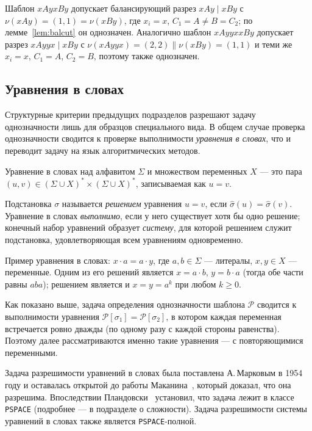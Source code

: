 \documentclass[14pt, russian]{scrartcl}
\begin{document}
\begin{Example}
Шаблон $x A y x B y$ допускает балансирующий разрез $xAy \mid xBy$ с
$\nu(xAy) = (1,1) = \nu(xBy)$, где $x_i = x$, $C_1 = A \neq B = C_2$; по
лемме~\ref{lem:balcut} он однозначен. Аналогично шаблон $x A y y x x B y$ допускает
разрез $xAyyx \mid xBy$ с $\nu(xAyyx) = (2,2) \parallel \nu(xBy) = (1,1)$ и теми же
$x_i = x$, $C_1 = A$, $C_2 = B$, поэтому также однозначен.
\end{Example}





\subsection{Уравнения в словах}
\label{sec:wordeq}

Структурные критерии предыдущих подразделов разрешают задачу однозначности лишь для
образцов специального вида. В общем случае проверка однозначности сводится к проверке
выполнимости \textit{уравнения в словах}, что и переводит задачу на язык алгоритмических
методов.

\begin{Definition}
Уравнение в словах над алфавитом $\Sigma$ и множеством переменных $X$ --- это
пара $(u, v) \in (\Sigma \cup X)^* \times (\Sigma \cup X)^*$, записываемая как
$u = v$.
\end{Definition}

Подстановка $\sigma$ называется \textit{решением} уравнения $u = v$, если
$\hat{\sigma}(u) = \hat{\sigma}(v)$. Уравнение в словах \textit{выполнимо}, если у него
существует хотя бы одно решение; конечный набор уравнений образует \textit{систему}, для
которой решением служит подстановка, удовлетворяющая всем уравнениям одновременно.

Пример уравнения в словах: $x \cdot a = a \cdot y$, где $a, b \in \Sigma$ --- литералы,
$x, y \in X$ --- переменные. Одним из его решений является $x = a \cdot b$,
$y = b \cdot a$ (тогда обе части равны $a b a$); решением является и $x = y = a^k$
при любом $k \ge 0$.

Как показано выше, задача определения однозначности шаблона $\mathcal{P}$ сводится к
выполнимости уравнения $\mathcal{P}[\sigma_1] = \mathcal{P}[\sigma_2]$, в котором каждая
переменная встречается ровно дважды (по одному разу с каждой стороны равенства). Поэтому
далее рассматриваются именно такие уравнения --- с повторяющимися переменными.

Задача разрешимости уравнений в словах была поставлена А.\,Марковым в 1954 году и
оставалась открытой до работы Маканина~\cite{makanin1977}, который доказал, что она
разрешима. Впоследствии Пландовски~\cite{plandowski2004} установил, что задача лежит
в классе \texttt{PSPACE} (подробнее --- в подразделе о сложности). Задача разрешимости
системы уравнений в словах также является \texttt{PSPACE}-полной.
\end{document}
